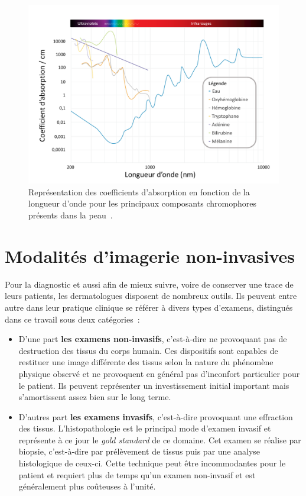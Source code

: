 \begin{figure}[H]
    \centering
    \includegraphics[width=\linewidth]{contents/chapter_2/resources/scheme_light_absorption.pdf}
    \caption{Représentation des coefficients d'absorption en fonction de la longueur d'onde pour les principaux composants chromophores présents dans la peau~\cite{Raulin2013}.}
    \label{fig:scheme_light_absorption}
\end{figure}
 
\clearpage

\section{Modalités d’imagerie non-invasives}
Pour la diagnostic et aussi afin de mieux suivre, voire de conserver une trace de leurs patients, les dermatologues disposent de nombreux outils. Ils peuvent entre autre dans leur pratique clinique se référer à divers types d’examens, distingués dans ce travail sous deux catégories~:
\begin{itemize}
    \item D’une part \textbf{les examens non-invasifs}, c’est-à-dire ne provoquant pas de destruction des tissus du corps humain. Ces dispositifs sont capables de restituer une image différente des tissus selon la nature du phénomène physique observé et ne provoquent en général pas d’inconfort particulier pour le patient. Ils peuvent représenter un investissement initial important mais s'amortissent assez bien sur le long terme. 
    \item D’autres part \textbf{les examens invasifs}, c’est-à-dire provoquant une effraction des tissus. L'histopathologie est le principal mode d'examen invasif et représente à ce jour le \textit{gold standard} de ce domaine. Cet examen se réalise par biopsie, c’est-à-dire par prélèvement de tissus puis par une analyse histologique de ceux-ci. Cette technique peut être incommodantes pour le patient et requiert plus de temps qu'un examen non-invasif et est généralement plus coûteuses à l'unité.
\end{itemize}\par


